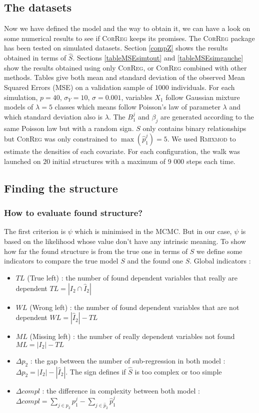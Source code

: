 \documentclass[11pt,a4paper]{article}
\begin{document}
	\subsection{The datasets}	
	Now we have defined the model and the way to obtain it, we can have a look on some numerical results to see if \textsc{CorReg} 	keeps its promises.
	The \textsc{CorReg} package has been tested on simulated datasets. 
Section \ref{compZ} shows the results obtained in terms of $\hat{S}$. Sections \ref{tableMSEsimtout} and \ref{tableMSEsimgauche} show the results obtained using only \textsc{CorReg}, or \textsc{CorReg} combined with other methods. Tables give both mean and standard deviation of the observed Mean Squared Errors (MSE) on a validation sample of $1 000$ individuals. For each simulation,  $p=40$, $\sigma_Y=10$, $\sigma=0.001$, variables $X_1$ follow Gaussian mixture models of $\lambda=5$ classes which means follow Poisson's law of parameter $\lambda$ and which standard deviation also is $\lambda$. The $B_1^j$ and $\beta_j$ are generated according to the same Poisson law but with a random sign. $S$ only contains binary relationships but \textsc{CorReg} was only constrained to $\max (\hat{p}_1^j)=5$.  
	We used \textsc{Rmixmod} to estimate the densities of each covariate. For each configuration, the walk was launched on $20$ initial structures with a maximum of 9 000 steps each time.
	
		\subsection{Finding the structure}
		\subsubsection{How to evaluate found structure?}
			The first criterion is $\psi$ which is minimised in the MCMC. But in our case, $\psi$ is based on the likelihood whose value don't have any intrinsic meaning. To show how far the found structure is from the true one in terms of $S$ we define some indicators to compare the true model $S$ and the found one $\hat{S}$.
			Global indicators :
			\begin{itemize}
				\item $TL$ (True left) : the number of found dependent variables that really are dependent $TL=|I_2\cap \hat{I}_2|$ 
				\item $WL$ (Wrong left) : the number of found dependent variables that are not dependent $WL=|\hat{I}_2|-TL$
				\item $ML$ (Missing left) : the number of really dependent variables not found $ML=|I_2|-TL$
				\item $\Delta p_2$ : the gap between the number of sub-regression in both model : $\Delta p_2=|I_2|-|\hat{I}_2|$. The sign defines if $\hat{S}$ is too complex or too simple
				\item $\Delta compl$ : the difference in complexity between both model : $\Delta compl=\sum_{j \in p_2}p_1^j-\sum_{j \in \hat{p}_2}\hat{p}_1^j$
			\end{itemize}
\end{document}
